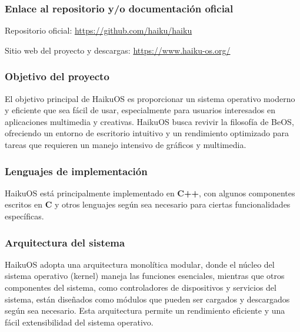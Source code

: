 \subsubsection{Enlace al repositorio y/o documentación oficial}

Repositorio oficial: \url{https://github.com/haiku/haiku}

Sitio web del proyecto y descargas: \url{https://www.haiku-os.org/}

\subsubsection{Objetivo del proyecto}
El objetivo principal de HaikuOS es proporcionar un sistema operativo moderno y eficiente que sea fácil de usar, especialmente para usuarios interesados en aplicaciones multimedia y creativas. HaikuOS busca revivir la filosofía de BeOS, ofreciendo un entorno de escritorio intuitivo y un rendimiento optimizado para tareas que requieren un manejo intensivo de gráficos y multimedia.

\subsubsection{Lenguajes de implementación}
HaikuOS está principalmente implementado en \textbf{C++}, con algunos componentes escritos en \textbf{C} y otros lenguajes según sea necesario para ciertas funcionalidades específicas.

\subsubsection{Arquitectura del sistema}
HaikuOS adopta una arquitectura monolítica modular, donde el núcleo del sistema operativo (kernel) maneja las funciones esenciales, mientras que otros componentes del sistema, como controladores de dispositivos y servicios del sistema, están diseñados como módulos que pueden ser cargados y descargados según sea necesario. Esta arquitectura permite un rendimiento eficiente y una fácil extensibilidad del sistema operativo.

